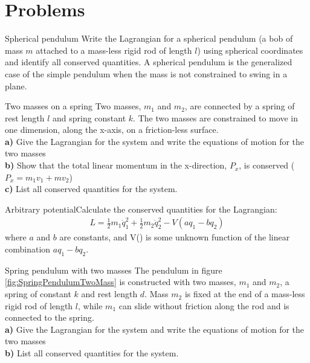 \section{Problems}
\begin{problem}{Spherical pendulum} Write the Lagrangian for a spherical pendulum (a bob of mass $m$ attached to a mass-less rigid rod of length $l$) using spherical coordinates and identify all conserved quantities. A spherical pendulum is the generalized case of the simple pendulum when the mass is not constrained to swing in a plane. 
\label{prob_ConsSym_1}
\end{problem}

\begin{problem}{Two masses on a spring} Two masses, $m_1$ and $m_2$, are connected by a spring of rest length $l$ and spring constant $k$. The two masses are constrained to move in one dimension, along the x-axis, on a friction-less surface.\\
\textbf{a)} Give the Lagrangian for the system and write the equations of motion for the two masses\\
\textbf{b)} Show that the total linear momentum in the x-direction, $P_x$, is conserved ($P_x=m_1v_1+mv_2$)\\
\textbf{c)} List all conserved quantities for the system.
\label{prob_ConsSym_2}
\end{problem}

\begin{problem}{Arbitrary potential}Calculate the conserved quantities for the Lagrangian:
\begin{align*}
L=\frac{1}{2}m_1\dot{q}_1^2+\frac{1}{2}m_2\dot{q}_2^2-V(aq_1-bq_2)
\end{align*}
where $a$ and $b$ are constants, and V() is some unknown function of the linear combination $aq_1-bq_2$.
\label{prob_ConsSym_3}
\end{problem}

\begin{problem}{Spring pendulum with two masses} The pendulum in figure \ref{fig:SpringPendulumTwoMass} is constructed with two masses, $m_1$ and $m_2$, a spring of constant $k$ and rest length $d$. Mass $m_2$ is fixed at the end of a mass-less rigid rod of length $l$, while $m_1$ can slide without friction along the rod and is connected to the spring.\\
\textbf{a)} Give the Lagrangian for the system and write the equations of motion for the two masses\\
\textbf{b)} List all conserved quantities for the system.
\label{prob_ConsSym_4}
\end{problem}



